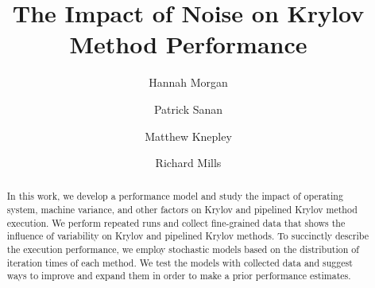 \documentclass[sigconf, anonymous]{acmart}
\begin{document}
%
\title{The Impact of Noise on Krylov Method Performance}

%
\author{Hannah Morgan}
\authornotemark[1]

\author{Patrick Sanan}

\author{Matthew Knepley}

\author{Richard Mills}
 
%
\renewcommand{\shortauthors}{Morgan, et al.}


%
\begin{abstract}
In this work, we develop a performance model and study the impact of 
operating system, machine variance, and other factors on Krylov and pipelined Krylov method execution.
We perform repeated runs and collect fine-grained data that 
 shows the influence of variability on Krylov and pipelined Krylov methods.
To succinctly describe the execution performance, we 
 employ stochastic models based on the distribution of iteration times of each method.
 We test the models with collected data and suggest ways to improve and expand them in order to make a prior performance estimates.
\end{abstract}
\end{document}
